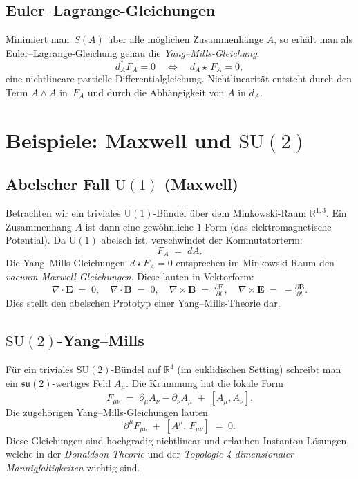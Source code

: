 \documentclass[10pt, letterpaper]{article}
\begin{document}
\subsection{Euler--Lagrange-Gleichungen}
Minimiert man \(\,S(A)\) über alle möglichen Zusammenhänge \(A\), so erhält man als Euler--Lagrange-Gleichung genau die \emph{Yang--Mills-Gleichung}:
\[
d_A^* F_A = 0 
\quad\Longleftrightarrow\quad
d_A \star\,F_A = 0,
\]
eine nichtlineare partielle Differentialgleichung.  
Nichtlinearität entsteht durch den Term \(A\wedge A\) in \(\,F_A\) und durch die Abhängigkeit von \(A\) in \(d_A\).

\section{Beispiele: Maxwell und \(\mathrm{SU}(2)\)}

\subsection{Abelscher Fall \(\mathrm{U}(1)\) (Maxwell)}
Betrachten wir ein triviales \(\mathrm{U}(1)\)-Bündel über dem Minkowski-Raum \(\mathbb{R}^{1,3}\). Ein Zusammenhang \(A\) ist dann eine gewöhnliche \(1\)-Form (das elektromagnetische Potential). Da \(\mathrm{U}(1)\) abelsch ist, verschwindet der Kommutatorterm:
\[
F_A \;=\; dA.
\]
Die Yang--Mills-Gleichungen \(\,d\star F_A=0\) entsprechen im Minkowski-Raum den \emph{vacuum Maxwell-Gleichungen}. Diese lauten in Vektorform:
\[
\nabla \cdot \mathbf{E} \;=\; 0, 
\quad
\nabla \cdot \mathbf{B} \;=\; 0,
\quad
\nabla\times \mathbf{B} \;=\; \tfrac{\partial \mathbf{E}}{\partial t},
\quad
\nabla\times \mathbf{E} \;=\; -\tfrac{\partial \mathbf{B}}{\partial t}.
\]
Dies stellt den abelschen Prototyp einer Yang--Mills-Theorie dar.

\subsection{\(\mathrm{SU}(2)\)-Yang--Mills}
Für ein triviales \(\mathrm{SU}(2)\)-Bündel auf \(\mathbb{R}^4\) (im euklidischen Setting) schreibt man ein \(\mathfrak{su}(2)\)-wertiges Feld \(A_\mu\). Die Krümmung hat die lokale Form
\[
F_{\mu\nu} \;=\;
\partial_\mu A_\nu
-\partial_\nu A_\mu
\;+\;
[A_\mu, A_\nu].
\]
Die zugehörigen Yang--Mills-Gleichungen lauten
\[
\partial^\mu F_{\mu\nu}
\;+\;
[A^\mu,\,F_{\mu\nu}]
\;=\;
0.
\]
Diese Gleichungen sind hochgradig nichtlinear und erlauben Instanton-Lösungen, welche in der \emph{Donaldson-Theorie} und der \emph{Topologie 4-dimensionaler Mannigfaltigkeiten} wichtig sind.
\end{document}
